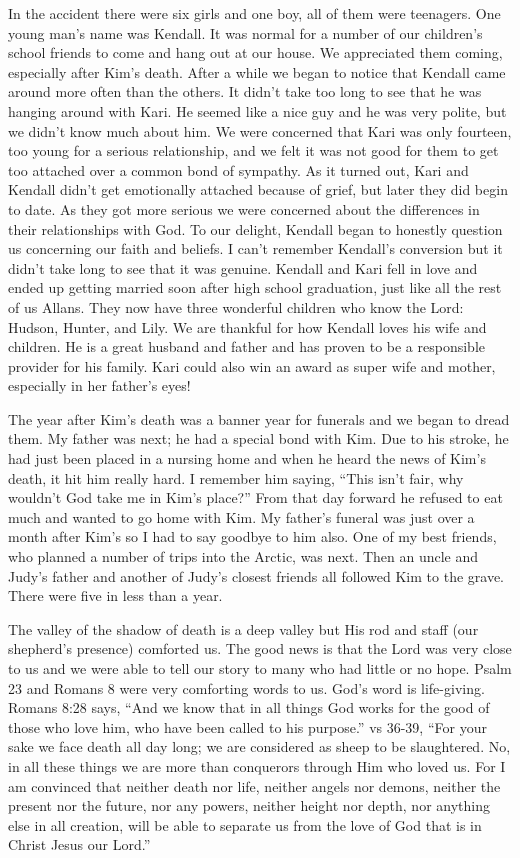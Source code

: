 \documentclass[twoside, 12pt]{book}
\begin{document}
In the accident there were six girls and one boy, all of them were teenagers. One young man's name was Kendall. It was normal for a number of our children’s school friends to come and hang out at our house. We appreciated them coming, especially after Kim’s death. After a while we began to notice that Kendall came around more often than the others. It didn't take too long to see that he was hanging around with Kari. He seemed like a nice guy and he was very polite, but we didn't know much about him. We were concerned that Kari was only fourteen, too young for a serious relationship, and we felt it was not good for them to get too attached over a common bond of sympathy. As it turned out, Kari and Kendall didn't get emotionally attached because of grief, but later they did begin to date. As they got more serious we were concerned about the differences in their relationships with God. To our delight, Kendall began to honestly question us concerning our faith and beliefs. I can't remember Kendall's conversion but it didn't take long to see that it was genuine. Kendall and Kari fell in love and ended up getting married soon after high school graduation, just like all the rest of us Allans. They now have three wonderful children who know the Lord: Hudson, Hunter, and Lily. We are thankful for how Kendall loves his wife and children. He is a great husband and father and has proven to be a responsible provider for his family. Kari could also win an award as super wife and mother, especially in her father's eyes!

The year after Kim’s death was a banner year for funerals and we began to dread them. My father was next; he had a special bond with Kim. Due to his stroke, he had just been placed in a nursing home and when he heard the news of Kim's death, it hit him really hard. I remember him saying, “This isn't fair, why wouldn't God take me in Kim’s place?” From that day forward he refused to eat much and wanted to go home with Kim. My father's funeral was just over a month after Kim’s so I had to say goodbye to him also. One of my best friends, who planned a number of trips into the Arctic, was next. Then an uncle and Judy's father and another of Judy's closest friends all followed Kim to the grave. There were five in less than a year. 

The valley of the shadow of death is a deep valley but His rod and staff (our shepherd's presence) comforted us. The good news is that the Lord was very close to us and we were able to tell our story to many who had little or no hope. Psalm 23 and Romans 8 were very comforting words to us. God's word is life-giving. Romans 8:28 says, “And we know that in all things God works for the good of those who love him, who have been called to his purpose.” vs 36-39, “For your sake we face death all day long; we are considered as sheep to be slaughtered. No, in all these things we are more than conquerors through Him who loved us. For I am convinced that neither death nor life, neither angels nor demons, neither the present nor the future, nor any powers, neither height nor depth, nor anything else in all creation, will be able to separate us from the love of God that is in Christ Jesus our Lord.”
\end{document}
